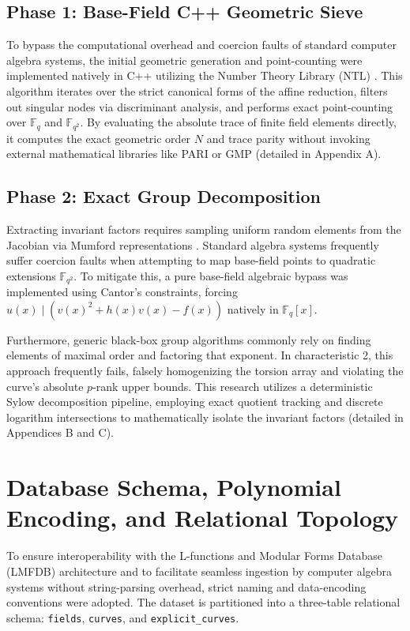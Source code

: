 \documentclass[11pt,letterpaper]{article}
\begin{document}
\subsection{Phase 1: Base-Field C++ Geometric Sieve}
To bypass the computational overhead and coercion faults of standard computer algebra systems, the initial geometric generation and point-counting were implemented natively in C++ utilizing the Number Theory Library (NTL) \cite{ShoupNTL}. This algorithm iterates over the strict canonical forms of the affine reduction, filters out singular nodes via discriminant analysis, and performs exact point-counting over $\mathbb{F}_q$ and $\mathbb{F}_{q^2}$. By evaluating the absolute trace of finite field elements directly, it computes the exact geometric order $N$ and trace parity without invoking external mathematical libraries like PARI or GMP (detailed in Appendix A).

\subsection{Phase 2: Exact Group Decomposition}
Extracting invariant factors requires sampling uniform random elements from the Jacobian via Mumford representations \cite{Cantor1987}. Standard algebra systems frequently suffer coercion faults when attempting to map base-field points to quadratic extensions $\mathbb{F}_{q^2}$. To mitigate this, a pure base-field algebraic bypass was implemented using Cantor's constraints, forcing $u(x) \mid \left( v(x)^2 + h(x)v(x) - f(x) \right)$ natively in $\mathbb{F}_q[x]$.

Furthermore, generic black-box group algorithms commonly rely on finding elements of maximal order and factoring that exponent. In characteristic 2, this approach frequently fails, falsely homogenizing the torsion array and violating the curve's absolute $p$-rank upper bounds. This research utilizes a deterministic Sylow decomposition pipeline, employing exact quotient tracking and discrete logarithm intersections to mathematically isolate the invariant factors (detailed in Appendices B and C).

\section{Database Schema, Polynomial Encoding, and Relational Topology}
To ensure interoperability with the L-functions and Modular Forms Database (LMFDB) architecture and to facilitate seamless ingestion by computer algebra systems without string-parsing overhead, strict naming and data-encoding conventions were adopted. The dataset is partitioned into a three-table relational schema: \texttt{fields}, \texttt{curves}, and \texttt{explicit\_curves}.
\end{document}
